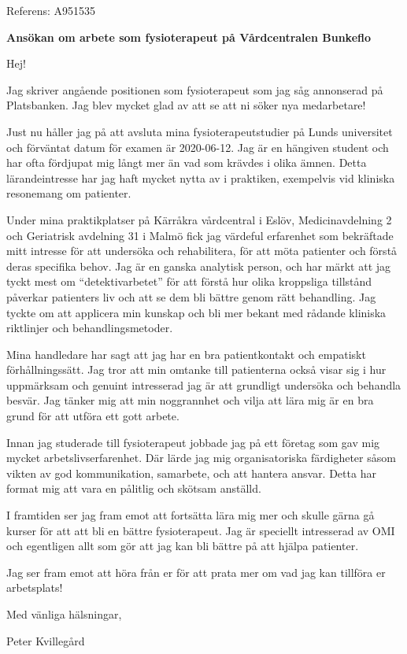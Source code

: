\documentclass[10pt,a4paper]{letter}
\begin{document}
 
	\begin{letter}{Referens: A951535} 
		
\opening{\textbf{Ansökan om arbete som fysioterapeut på Vårdcentralen Bunkeflo}}
Hej!

Jag skriver angående positionen som fysioterapeut som jag såg annonserad på Platsbanken. Jag blev mycket glad av att se att ni söker nya medarbetare!

Just nu håller jag på att avsluta mina fysioterapeutstudier på Lunds universitet och förväntat \mbox{datum} för examen är 2020-06-12. Jag är en hängiven student och har ofta fördjupat mig långt mer än vad som krävdes i olika ämnen. Detta lärande\-intresse har jag haft mycket nytta av i praktiken, exempelvis vid kliniska resonemang om patienter.

Under mina praktikplatser på Kärråkra vårdcentral i Eslöv, Medicinavdelning 2 och Geriatrisk avdelning 31 i Malmö fick jag värdeful erfarenhet som bekräftade mitt intresse för att undersöka och rehabilitera, för att möta patienter och förstå deras specifika behov. Jag är en ganska analytisk person, och har märkt att jag tyckt mest om ``detektivarbetet'' för att förstå hur olika kroppsliga tillstånd påverkar patienters liv och att se dem bli bättre genom rätt behandling. Jag tyckte om att applicera min kunskap och bli mer bekant med rådande kliniska riktlinjer och behandlingsmetoder. 

Mina handledare har sagt att jag har en bra patientkontakt och empatiskt förhållningssätt. Jag tror att min omtanke till patienterna också visar sig i hur uppmärksam och genuint intresserad jag är att grundligt undersöka och behandla besvär. Jag tänker mig att min noggrannhet och vilja att lära mig är en bra grund för att utföra ett gott arbete.

Innan jag studerade till fysioterapeut jobbade jag på ett företag som gav mig mycket arbetslivserfarenhet. Där lärde jag mig organisatoriska färdigheter såsom vikten av god kommunikation, samarbete, och att hantera ansvar. Detta har format mig att vara en pålitlig och skötsam anställd. 

I framtiden ser jag fram emot att fortsätta lära mig mer och skulle gärna gå kurser för att att bli en bättre fysioterapeut. Jag är speciellt intresserad av OMI och egentligen allt som gör att jag kan bli bättre på att hjälpa patienter.

Jag ser fram emot att höra från er för att prata mer om vad jag kan tillföra er arbetsplats!
	
\vspace{1em}
\hspace{0.1\linewidth}Med vänliga hälsningar,

\hspace{0.1\linewidth}Peter Kvillegård
		 
 
\end{letter} 
\end{document}
